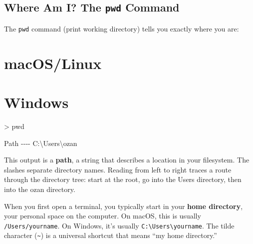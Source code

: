 \documentclass[
  letterpaper,
  DIV=11,
  numbers=noendperiod]{scrreprt}
\newenvironment{Shaded}{\begin{snugshade}}{\end{snugshade}}
\newcommand{\ExtensionTok}[1]{\textcolor[rgb]{0.00,0.23,0.31}{#1}}
\newcommand{\FunctionTok}[1]{\textcolor[rgb]{0.28,0.35,0.67}{#1}}
\newcommand{\NormalTok}[1]{\textcolor[rgb]{0.00,0.23,0.31}{#1}}
\newcommand{\OperatorTok}[1]{\textcolor[rgb]{0.37,0.37,0.37}{#1}}
\begin{document}
\subsection{\texorpdfstring{Where Am I? The \texttt{pwd}
Command}{Where Am I? The pwd Command}}\label{where-am-i-the-pwd-command}

The \texttt{pwd} command (print working directory) tells you exactly
where you are:

\section{macOS/Linux}

\begin{codelisting}

\caption{\texttt{terminal}}

\begin{Shaded}
\end{Shaded}

\end{codelisting}

\section{Windows}

\begin{codelisting}

\caption{\texttt{terminal}}

\begin{Shaded}
\begin{Highlighting}[]
\OperatorTok{\textgreater{}} \FunctionTok{pwd}

\NormalTok{Path}
\OperatorTok{{-}{-}{-}{-}}
\NormalTok{C}\OperatorTok{:}\NormalTok{\textbackslash{}Users\textbackslash{}ozan}
\end{Highlighting}
\end{Shaded}

\end{codelisting}

This output is a \textbf{path}, a string that describes a location in
your filesystem. The slashes separate directory names. Reading from left
to right traces a route through the directory tree: start at the root,
go into the Users directory, then into the ozan directory.

When you first open a terminal, you typically start in your \textbf{home
directory}, your personal space on the computer. On macOS, this is
usually \texttt{/Users/yourname}. On Windows, it's usually
\texttt{C:\textbackslash{}Users\textbackslash{}yourname}. The tilde
character (\texttt{\textasciitilde{}}) is a universal shortcut that
means ``my home directory.''
\end{document}
